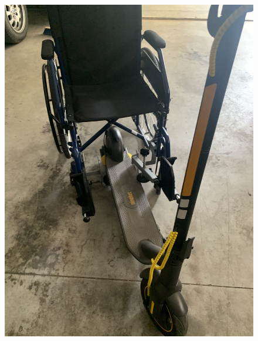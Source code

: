 \documentclass[binding=0.6cm,LaM,noexaminfo]{sapthesis}
\begin{document}
\begin{figure}[!htp]
    \begin{minipage}[t]{.5\textwidth}
    \centering\includegraphics[width=.95\textwidth]{images/finished_project/IMG_3762.jpg}
    \end{minipage}
    \begin{minipage}[t]{.5\textwidth}

\end{minipage}
\end{figure}
\end{document}
